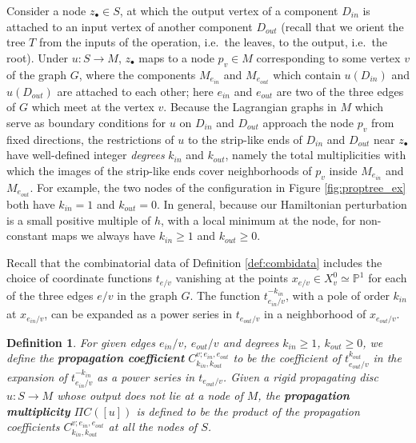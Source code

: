 \documentclass[11pt,leqno]{amsart}
\newtheorem{defi}[theo]{Definition}
\numberwithin{equation}{section}
\def\PP{{\mathbb P}}
\begin{document}
Consider a node $z_\bullet\in S$, at which the output vertex of a component $D_{in}$ 
is attached to an input vertex of another component $D_{out}$ (recall that we
orient the tree $T$ from the inputs of the operation, i.e.\ the leaves, to the 
output, i.e.\ the root). Under $u:S\to M$, $z_\bullet$ maps to a
node $p_v\in M$ corresponding to some vertex $v$ of the graph $G$, where
the components $M_{e_{in}}$ and $M_{e_{out}}$ which contain
$u(D_{in})$ and $u(D_{out})$ are attached to each other; here $e_{in}$ and
$e_{out}$ are two of the three edges of $G$ which meet at the vertex $v$.
Because the Lagrangian graphs in $M$ which serve as boundary conditions
for $u$ on $D_{in}$ and $D_{out}$ approach the node $p_v$ from fixed directions,
the restrictions of $u$ to the strip-like ends of $D_{in}$ and $D_{out}$
near $z_\bullet$ have well-defined integer {\em degrees} $k_{in}$ and $k_{out}$,
namely the total multiplicities with which the images of the strip-like ends
cover neighborhoods of $p_v$ inside $M_{e_{in}}$ and $M_{e_{out}}$.
For example, the two nodes of the configuration in Figure \ref{fig:proptree_ex}
both have $k_{in}=1$ and $k_{out}=0$. In general, because our Hamiltonian perturbation is
a small positive multiple of $h$, with a local minimum at the node,
for non-constant maps we always have $k_{in}\geq 1$ and $k_{out}\geq 0$.

Recall that the combinatorial data of Definition \ref{def:combidata} includes the choice
of coordinate functions $t_{e/v}$ vanishing at the points $x_{e/v}\in X^0_v\simeq \PP^1$ 
for each of the three edges $e/v$ in the graph $G$. The function $t_{e_{in}/v}^{-k_{in}}$,
with a pole of order $k_{in}$ at $x_{e_{in}/v}$, can be expanded as a power series
in $t_{e_{out}/v}$ in a neighborhood of $x_{e_{out}/v}$.

\begin{defi}\label{defi:propcoeff} 
For given edges $e_{in}/v$, $e_{out}/v$ and degrees $k_{in}\geq 1$, $k_{out}\geq 0$, 
we define the {\bf propagation coefficient}
$C^{v;e_{in},e_{out}}_{k_{in},k_{out}}$ to be the coefficient of
$t_{e_{out}/v}^{k_{out}}$ in the expansion of $t_{e_{in}/v}^{-k_{in}}$ as a
power series in $t_{e_{out}/v}$.
Given a rigid propagating disc $u:S\to M$ whose output does not lie at a node of $M$,
the {\bf propagation multiplicity} $\Pi C([u])$ is defined to be the product
of the propagation coefficients $C^{v;e_{in},e_{out}}_{k_{in},k_{out}}$
at all the nodes of $S$.
\end{defi}
\end{document}
